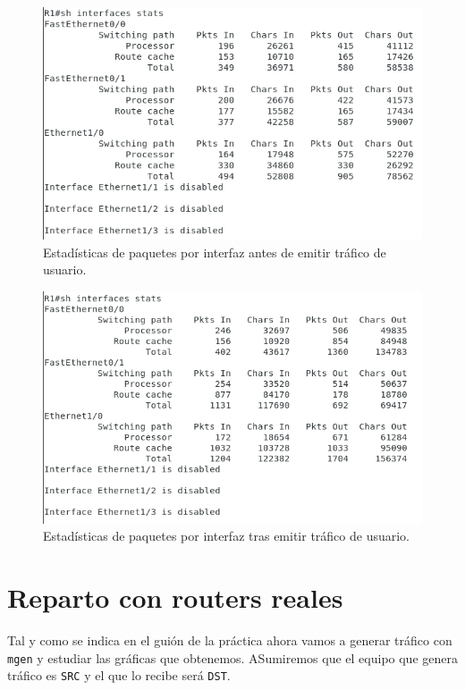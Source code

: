 \documentclass[11pt]{article}
\begin{document}
            \begin{figure}
                \centering
                \includegraphics[width=0.6\linewidth]{ifaceStatsNoBalancingStart.png}
                \caption{Estadísticas de paquetes por interfaz antes de emitir tráfico de usuario.}
                \label{fig:ifaceStatsNoBalancingStart}
            \end{figure}

            \begin{figure}
                \centering
                \includegraphics[width=0.6\linewidth]{ifaceStatsNoBalancingEnd.png}
                \caption{Estadísticas de paquetes por interfaz tras emitir tráfico de usuario.}
                \label{fig:ifaceStatsNoBalancingEnd}
            \end{figure}

    \section{Reparto con routers reales}
        Tal y como se indica en el guión de la práctica ahora vamos a generar tráfico con \texttt{mgen} y estudiar las gráficas que obtenemos. ASumiremos que el equipo que genera tráfico es \texttt{SRC} y el que lo recibe será \texttt{DST}.
\end{document}
